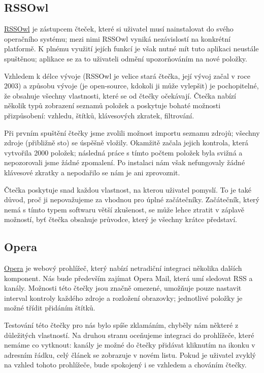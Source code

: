 \subsection{RSSOwl}

\href{http://www.rssowl.org/}{RSSOwl} je zástupcem čteček, které si uživatel musí nainstalovat do svého operačního systému; mezi nimi RSSOwl vyniká nezávislostí na konkrétní platformě.
K plnému využití jejích funkcí je však nutné mít tuto aplikaci neustále spuštěnou; aplikace se za to uživateli odmění upozorňováním na nové položky.

Vzhledem k délce vývoje (RSSOwl je velice stará čtečka, její vývoj začal v roce 2003) a způsobu vývoje (je open-source, kdokoli ji může vylepšit) je pochopitelné, že obsahuje všechny vlastnosti, které se od čtečky očekávají.
Čtečka nabízí několik typů zobrazení seznamů položek a poskytuje bohaté možnosti přizpůsobení: vzhledu, štítků, klávesových zkratek, filtrování.

Při prvním spuštění čtečky jsme zvolili možnost importu seznamu zdrojů; všechny zdroje (přibližně sto) se úspěšně vložily.
Okamžitě začala jejich kontrola, která vytvořila 2000 položek; následná práce s tímto počtem položek byla svižná a nepozorovali jsme žádné zpomalení.
Po instalaci nám však nefungovaly žádné klávesové zkratky a nepodařilo se nám je ani zprovoznit.

Čtečka poskytuje snad každou vlastnost, na kterou uživatel pomyslí.
To je také důvod, proč ji nepovažujeme za vhodnou pro úplné začátečníky.
Začátečník, který nemá s tímto typem softwaru větší zkušenost, se může lehce ztratit v záplavě možností, byť čtečka obsahuje průvodce, který je všechny krátce představí.

\subsection{Opera}

\href{http://www.opera.com/}{Opera} je webový prohlížeč, který nabízí netradiční integraci několika dalších komponent.
Nás bude především zajímat Opera Mail, která umí sledovat RSS a  kanály.
Možnosti této čtečky jsou značně omezené, umožňuje pouze nastavit interval kontroly každého zdroje a rozložení obrazovky; jednotlivé položky je možné třídit přidáním štítků.

Testování této čtečky pro nás bylo spíše zklamáním, chyběly nám některé z důležitých vlastností.
Na druhou stranu oceňujeme integraci do prohlížeče, které nemáme co vytknout: kanály je možné do čtečky přidávat kliknutím na ikonku v adresním řádku, celý článek se zobrazuje v novém listu.
Pokud je uživatel zvyklý na vzhled tohoto prohlížeče, bude spokojený i se vzhledem a chováním čtečky.


